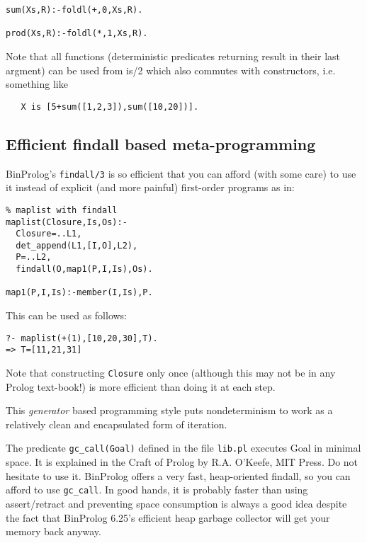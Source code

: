 \documentclass{article}
\begin{document}
\begin{verbatim}
sum(Xs,R):-foldl(+,0,Xs,R).

prod(Xs,R):-foldl(*,1,Xs,R).
\end{verbatim}

Note that all functions (deterministic predicates returning result in their last argment)
can be used from is/2 which also commutes with constructors, i.e. something like

\begin{verbatim}
   X is [5+sum([1,2,3]),sum([10,20])].
\end{verbatim}

\subsection{Efficient findall based meta-programming}

BinProlog's {\tt findall/3} is so efficient that you can
afford (with some care) to use it instead of explicit
(and more painful) first-order programs as in:

\begin{verbatim}
% maplist with findall
maplist(Closure,Is,Os):-
  Closure=..L1,
  det_append(L1,[I,O],L2),
  P=..L2,
  findall(O,map1(P,I,Is),Os).

map1(P,I,Is):-member(I,Is),P.
\end{verbatim}

This can be used as follows:

\begin{verbatim}
?- maplist(+(1),[10,20,30],T).
=> T=[11,21,31]
\end{verbatim}

Note that constructing {\tt Closure} only once (although this 
may not be in any Prolog text-book!) is more efficient
than doing it at each step.

This {\em generator} based programming style puts nondeterminism
to work as a relatively clean and encapsulated form of
iteration.

The predicate {\tt gc\_call(Goal)} defined in the file {\tt lib.pl}
executes Goal in minimal space.  It is explained in the Craft of Prolog
by R.A. O'Keefe, MIT Press.
Do not hesitate to use it. BinProlog offers a very fast, heap-oriented
findall, so you can afford to use {\tt gc\_call}. In good hands, it is
probably faster than using assert/retract and preventing
space consumption is always a good idea despite the fact
that BinProlog 6.25's efficient heap garbage collector will
get your memory back anyway.
\end{document}
